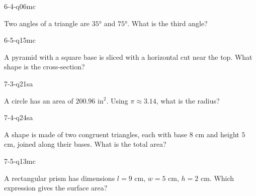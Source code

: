 \begin{practiceQuestion}{6-4-q06}{mc}
\begin{questionText}
Two angles of a triangle are $35°$ and $75°$. What is the third angle?
\end{questionText}
\end{practiceQuestion}

\begin{practiceQuestion}{6-5-q15}{mc}
\begin{questionText}
A pyramid with a square base is sliced with a horizontal cut near the top. What shape is the cross-section?
\end{questionText}
\end{practiceQuestion}

\begin{practiceQuestion}{7-3-q21}{sa}
\begin{questionText}
A circle has an area of $200.96$ in$^2$. Using $\pi \approx 3.14$, what is the radius?
\end{questionText}
\end{practiceQuestion}

\begin{practiceQuestion}{7-4-q24}{sa}
\begin{questionText}
A shape is made of two congruent triangles, each with base $8$ cm and height $5$ cm, joined along their bases. What is the total area?
\end{questionText}
\end{practiceQuestion}

\begin{practiceQuestion}{7-5-q13}{mc}
\begin{questionText}
A rectangular prism has dimensions $l = 9$ cm, $w = 5$ cm, $h = 2$ cm. Which expression gives the surface area?
\end{questionText}
\end{practiceQuestion}

